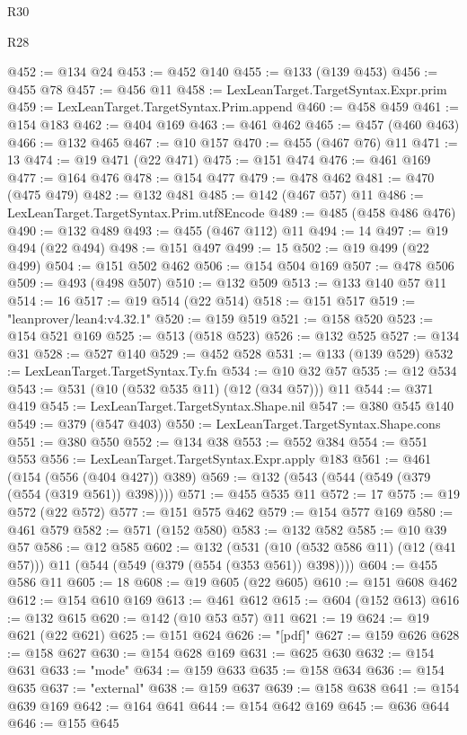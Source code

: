 \begin{lexlean}{R30}
\begin{lexlean}{R28}
\begin{coremodule}
{{{{{{{{{{{{{{{{{{{{{{{{{{{{{{{{{{{{{{{{{{{{{{{{{{{{{{{{{{{{{{{{{{{{{{{{{{{{{{{{{{{{{{{{{{{{{{{{{{{{{{{{{{{{{{{{{{{{{{{{{{{{{{{{{{{{{{{{{{{{{{{@452 := @134 @24
@453 := @452 @140
@455 := @133 (@139 @453)
@456 := @455 @78
@457 := @456 @11
@458 := LexLeanTarget.TargetSyntax.Expr.prim
@459 := LexLeanTarget.TargetSyntax.Prim.append
@460 := @458 @459
@461 := @154 @183
@462 := @404 @169
@463 := @461 @462
@465 := @457 (@460 @463)
@466 := @132 @465
@467 := @10 @157
@470 := @455 (@467 @76) @11
@471 := 13
@474 := @19 @471 (@22 @471)
@475 := @151 @474
@476 := @461 @169
@477 := @164 @476
@478 := @154 @477
@479 := @478 @462
@481 := @470 (@475 @479)
@482 := @132 @481
@485 := @142 (@467 @57) @11
@486 := LexLeanTarget.TargetSyntax.Prim.utf8Encode
@489 := @485 (@458 @486 @476)
@490 := @132 @489
@493 := @455 (@467 @112) @11
@494 := 14
@497 := @19 @494 (@22 @494)
@498 := @151 @497
@499 := 15
@502 := @19 @499 (@22 @499)
@504 := @151 @502 @462
@506 := @154 @504 @169
@507 := @478 @506
@509 := @493 (@498 @507)
@510 := @132 @509
@513 := @133 @140 @57 @11
@514 := 16
@517 := @19 @514 (@22 @514)
@518 := @151 @517
@519 := "leanprover/lean4:v4.32.1"
@520 := @159 @519
@521 := @158 @520
@523 := @154 @521 @169
@525 := @513 (@518 @523)
@526 := @132 @525
@527 := @134 @31
@528 := @527 @140
@529 := @452 @528
@531 := @133 (@139 @529)
@532 := LexLeanTarget.TargetSyntax.Ty.fn
@534 := @10 @32 @57
@535 := @12 @534
@543 := @531 (@10 (@532 @535 @11) (@12 (@34 @57))) @11
@544 := @371 @419
@545 := LexLeanTarget.TargetSyntax.Shape.nil
@547 := @380 @545 @140
@549 := @379 (@547 @403)
@550 := LexLeanTarget.TargetSyntax.Shape.cons
@551 := @380 @550
@552 := @134 @38
@553 := @552 @384
@554 := @551 @553
@556 := LexLeanTarget.TargetSyntax.Expr.apply @183
@561 := @461 (@154 (@556 (@404 @427)) @389)
@569 := @132 (@543 (@544 (@549 (@379 (@554 (@319 @561)) @398))))
@571 := @455 @535 @11
@572 := 17
@575 := @19 @572 (@22 @572)
@577 := @151 @575 @462
@579 := @154 @577 @169
@580 := @461 @579
@582 := @571 (@152 @580)
@583 := @132 @582
@585 := @10 @39 @57
@586 := @12 @585
@602 := @132
    (@531 (@10 (@532 @586 @11) (@12 (@41 @57))) @11 (@544 (@549 (@379 (@554 (@353 @561)) @398))))
@604 := @455 @586 @11
@605 := 18
@608 := @19 @605 (@22 @605)
@610 := @151 @608 @462
@612 := @154 @610 @169
@613 := @461 @612
@615 := @604 (@152 @613)
@616 := @132 @615
@620 := @142 (@10 @53 @57) @11
@621 := 19
@624 := @19 @621 (@22 @621)
@625 := @151 @624
@626 := "[pdf]"
@627 := @159 @626
@628 := @158 @627
@630 := @154 @628 @169
@631 := @625 @630
@632 := @154 @631
@633 := "mode"
@634 := @159 @633
@635 := @158 @634
@636 := @154 @635
@637 := "external"
@638 := @159 @637
@639 := @158 @638
@641 := @154 @639 @169
@642 := @164 @641
@644 := @154 @642 @169
@645 := @636 @644
@646 := @155 @645
}}}}}}}}}}}}}}}}}}}}}}}}}}}}}}}}}}}}}}}}}}}}}}}}}}}}}}}}}}}}}}}}}}}}}}}}}}}}}}}}}}}}}}}}}}}}}}}}}}}}}}}}}}}}}}}}}}}}}}}}}}}}}}}}}}}}}}}}}}}}}}}
\end{coremodule}
\end{lexlean}
\end{lexlean}

